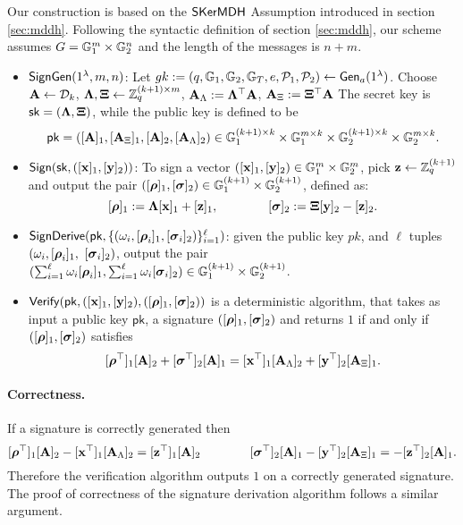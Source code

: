 Our construction is based on the $\mathsf{SKerMDH}$ Assumption introduced in section \ref{sec:mddh}. Following the syntactic definition of section \ref{sec:mddh},
our scheme assumes $G = \mathbb{G}_1^m\times\mathbb{G}_2^n$ and the length of the messages is $n+m$.
 
\begin{itemize}
\item $\mathsf{SignGen}(1^\lambda,m,n)$:
Let $gk:=(q,\mathbb{G}_1,\mathbb{G}_2,\mathbb{G}_T,e,\mathcal{P}_1,\mathcal{P}_2)\gets \mathsf{Gen}_a(1^\lambda)$.
Choose $\mathbf{{A}} \leftarrow \mathcal{D}_{k}$,
$\mathbf{{\Lambda}},\mathbf{{\Xi}} \leftarrow \mathbb{Z}_q^{(k+1) \times m}$, $\mathbf{A}_{\Lambda}:=\mathbf{{\Lambda}}^\top \mathbf{{A}}$, 
$\mathbf{A}_{\Xi}:=\mathbf{{\Xi}}^\top \mathbf{{A}}$
The secret key is $\mathsf{sk}=(\mathbf{{\Lambda}},\mathbf{{\Xi}})$, while the public key is defined to be
$$\mathsf{pk}=([\mathbf{A}]_1, [\mathbf{A}_{\Xi}]_1,[\mathbf{A}]_2, [\mathbf{A}_{\Lambda}]_2) \in  \mathbb{G}_1^{(k+1) \times k} \times \mathbb{G}_1^{m \times k} \times \mathbb{G}_2^{(k+1) \times k} \times \mathbb{G}_2^{m \times k}.$$
\item $\mathsf{Sign}(\mathsf{sk},([\mathbf{x}]_1,[\mathbf{y}]_2))$: To sign a vector $([\mathbf{x}]_1,[\mathbf{y}]_2) \in \mathbb{G}_1^{m} \times \mathbb{G}_2^{m}$, pick 
$\mathbf{z} \leftarrow \mathbb{Z}_q^{(k+1)}$ and output the pair 
$([{\boldsymbol \rho}]_1, [{\boldsymbol \sigma}]_2) \in \mathbb{G}_1^{(k+1)} \times \mathbb{G}_2^{(k+1)}$, defined as:
$$[{\boldsymbol \rho}]_1:=   \mathbf{{\Lambda}}[\mathbf{x}]_1 + [\mathbf{z}]_1,
                            \qquad \qquad 
[{\boldsymbol \sigma}]_2 := \mathbf{{\Xi}}[\mathbf{y}]_2 - [\mathbf{z}]_2.$$   
 \item  $\mathsf{SignDerive}(\mathsf{pk},\{(\omega_i,[{\boldsymbol \rho}_i]_1, [{\boldsymbol \sigma}_i]_2)\}_{i=1}^{\ell})$: given the public key $pk$, and $\ell$ tuples 
 $(\omega_i,[{\boldsymbol \rho}_i]_1,$ $[{\boldsymbol \sigma}_i]_2)$, output the pair 
 $(\sum_{i=1}^{\ell} \omega_i [{\boldsymbol \rho}_i]_1, \sum_{i=1}^{\ell} \omega_i  [{\boldsymbol \sigma}_i]_2) \in \mathbb{G}_1^{(k+1)} \times \mathbb{G}_2^{(k+1)}$. 
 \item $\mathsf{Verify}(\mathsf{pk},([\mathbf{x}]_1,[\mathbf{y}]_2), ([{\boldsymbol \rho}]_1, [{\boldsymbol \sigma}]_2))$  is a deterministic algorithm, that takes as input a public key $\mathsf{pk}$,  a signature $([{\boldsymbol \rho}]_1, [{\boldsymbol \sigma}]_2)$ and returns $1$ if and only if 
$([{\boldsymbol \rho}]_1, [{\boldsymbol \sigma}]_2)$ satisfies
$$ [{\boldsymbol \rho}^{\top}]_1 [\mathbf{A}]_2+ [{\boldsymbol \sigma}^{\top}]_2 [\mathbf{A}]_1= [\mathbf{x}^{\top}]_1 [\mathbf{A}_{\Lambda}]_2+[\mathbf{y}^{\top}]_2[\mathbf{A}_{\Xi}]_1. $$
\end{itemize}

\paragraph{Correctness.} If a signature is correctly generated then 
$$[{\boldsymbol \rho}^{\top}]_1 [\mathbf{{A}}]_2-[\mathbf{x}^{\top}]_1 [\mathbf{{A}}_{\Lambda}]_2= [\mathbf{z}^{\top}]_1 [\mathbf{{A}}]_2 \qquad \qquad  [{\boldsymbol \sigma}^{\top}]_2[\mathbf{{A}}]_1 -[\mathbf{y}^{\top}]_2  [\mathbf{{A}}_{\Xi}]_1= -[\mathbf{z}^{\top}]_2 [\mathbf{{A}}]_1.$$
Therefore the verification algorithm outputs $1$ on a correctly generated signature. The proof of correctness  of the signature derivation algorithm follows a similar argument.  

